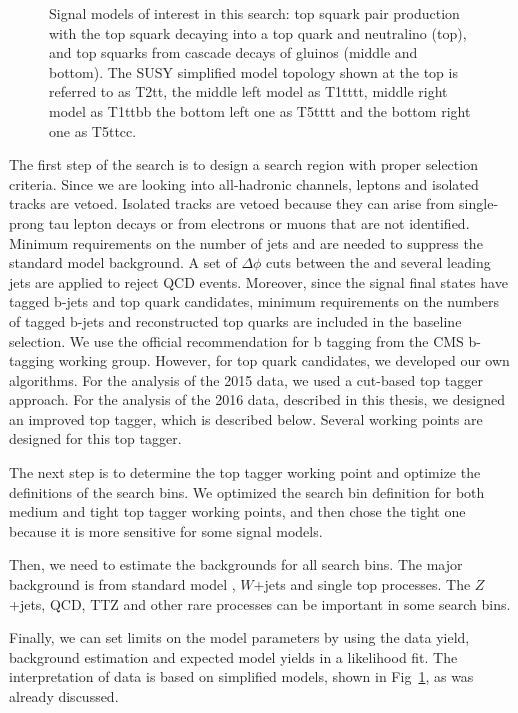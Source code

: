 \begin{figure}[ht!]
\begin{centering}
\caption{Signal models of interest in this search:
top squark pair production with the top squark decaying into a top quark and
neutralino (top),
and top squarks from cascade decays of gluinos (middle and bottom).
The SUSY simplified model topology shown at the top is referred to as T2tt,
the middle left model as T1tttt, middle right model as T1ttbb
the bottom left one as T5tttt and the bottom right one as T5ttcc.}
\label{fig:signal_diagrams}
\end{centering}
\end{figure}

The first step of the search is to design a search region with proper selection criteria. Since we are looking into all-hadronic channels, leptons and isolated tracks are vetoed. Isolated tracks are vetoed because they can arise from single-prong tau lepton decays or from electrons or muons that are not identified. Minimum requirements on the number of jets and \MET are needed to suppress the standard model background. A set of $\Delta\phi$ cuts between the \MET and several leading jets are applied to reject QCD events. Moreover, since the signal final states have tagged b-jets and top quark candidates, minimum requirements on the numbers of tagged b-jets and reconstructed top quarks are included in the baseline selection. We use the official recommendation for b tagging from the CMS b-tagging working group. However, for top quark candidates, we developed our own algorithms. For the analysis of the 2015 data, we used a cut-based top tagger approach\cite{PhysRevD.96.012004}. For the analysis of the 2016 data, described in this thesis, we designed an improved top tagger, which is described below. Several working points are designed for this top tagger.

The next step is to determine the top tagger working point and optimize the definitions of the search bins. We optimized the search bin definition for both medium and tight top tagger working points, and then chose the tight one because it is more sensitive for some signal models.

Then, we need to estimate the backgrounds for all search bins. The major background is from standard model \ttbar, $W$+jets and single top processes. The $Z$+jets, QCD, TTZ and other rare processes can be important in some search bins.

Finally, we can set limits on the model parameters by using the data yield, background estimation and expected model yields in a likelihood fit. The interpretation of data is based on simplified models\cite{Alwall:2008ag}, shown in Fig~\ref{fig:signal_diagrams}, as was already discussed.
